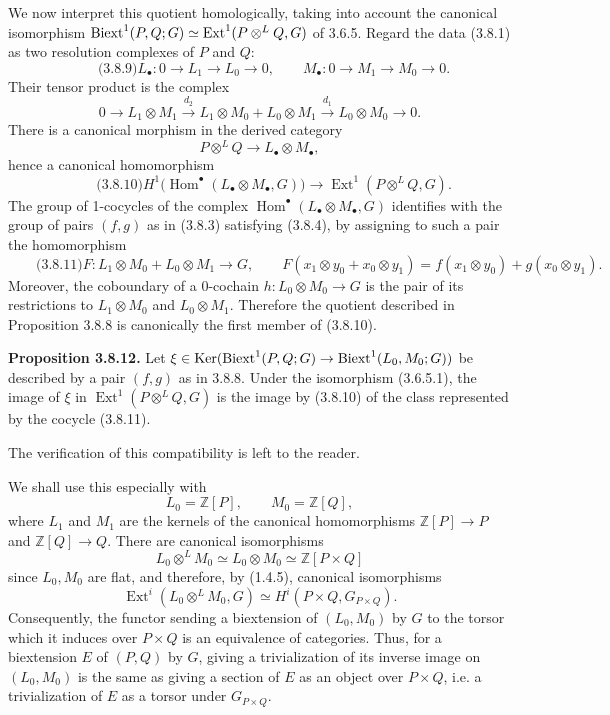 \documentclass[11pt]{article}
\providecommand{\Ker}{\operatorname{Ker}}
\providecommand{\Z}{\mathbb Z}
\providecommand{\Hom}{\operatorname{Hom}}
\providecommand{\Ext}{\operatorname{Ext}}
\begin{document}
We now interpret this quotient homologically, taking into account the canonical isomorphism
\(\Biext^1(P,Q;G)\simeq\Ext^1(P\otimes^L Q,G)\) of 3.6.5.  Regard the data (3.8.1) as two resolution complexes of \(P\) and \(Q\):
\begin{equation}\qquad\text{(3.8.9)}
        L_\bullet:0\longrightarrow L_1\longrightarrow L_0\longrightarrow 0,
        \qquad
        M_\bullet:0\longrightarrow M_1\longrightarrow M_0\longrightarrow 0.
\end{equation}
Their tensor product is the complex
\[
        0\longrightarrow L_1\otimes M_1
        \xrightarrow{d_2}L_1\otimes M_0+L_0\otimes M_1
        \xrightarrow{d_1}L_0\otimes M_0
        \longrightarrow0.
\]
There is a canonical morphism in the derived category
\[
        P\otimes^L Q\longrightarrow L_\bullet\otimes M_\bullet,
\]
hence a canonical homomorphism
\begin{equation}\qquad\text{(3.8.10)}
        H^1\bigl(\Hom^\bullet(L_\bullet\otimes M_\bullet,G)\bigr)
        \longrightarrow \Ext^1(P\otimes^L Q,G).
\end{equation}
The group of 1-cocycles of the complex \(\Hom^\bullet(L_\bullet\otimes M_\bullet,G)\) identifies with the group of pairs \((f,g)\) as in (3.8.3) satisfying (3.8.4), by assigning to such a pair the homomorphism
\begin{equation}\qquad\text{(3.8.11)}
        F:L_1\otimes M_0+L_0\otimes M_1\longrightarrow G,
        \qquad
        F(x_1\otimes y_0+x_0\otimes y_1)=f(x_1\otimes y_0)+g(x_0\otimes y_1).
\end{equation}
Moreover, the coboundary of a 0-cochain \(h:L_0\otimes M_0\to G\) is the pair of its restrictions to \(L_1\otimes M_0\) and \(L_0\otimes M_1\).  Therefore the quotient described in Proposition 3.8.8 is canonically the first member of (3.8.10).

\textbf{Proposition 3.8.12.}  Let \(\xi\in\Ker(\Biext^1(P,Q;G)\to\Biext^1(L_0,M_0;G))\) be described by a pair \((f,g)\) as in 3.8.8.  Under the isomorphism (3.6.5.1), the image of \(\xi\) in \(\Ext^1(P\otimes^L Q,G)\) is the image by (3.8.10) of the class represented by the cocycle (3.8.11).

The verification of this compatibility is left to the reader.

We shall use this especially with
\[
        L_0=\Z[P],\qquad M_0=\Z[Q],
\]
where \(L_1\) and \(M_1\) are the kernels of the canonical homomorphisms \(\Z[P]\to P\) and \(\Z[Q]\to Q\).  There are canonical isomorphisms
\[
        L_0\otimes^L M_0\simeq L_0\otimes M_0\simeq \Z[P\times Q]
\]
since \(L_0,M_0\) are flat, and therefore, by (1.4.5), canonical isomorphisms
\[
        \Ext^i(L_0\otimes^L M_0,G)
        \simeq H^i(P\times Q,G_{P\times Q}).
\]
Consequently, the functor sending a biextension of \((L_0,M_0)\) by \(G\) to the torsor which it induces over \(P\times Q\) is an equivalence of categories.  Thus, for a biextension \(E\) of \((P,Q)\) by \(G\), giving a trivialization of its inverse image on \((L_0,M_0)\) is the same as giving a section of \(E\) as an object over \(P\times Q\), i.e. a trivialization of \(E\) as a torsor under \(G_{P\times Q}\).
\end{document}
